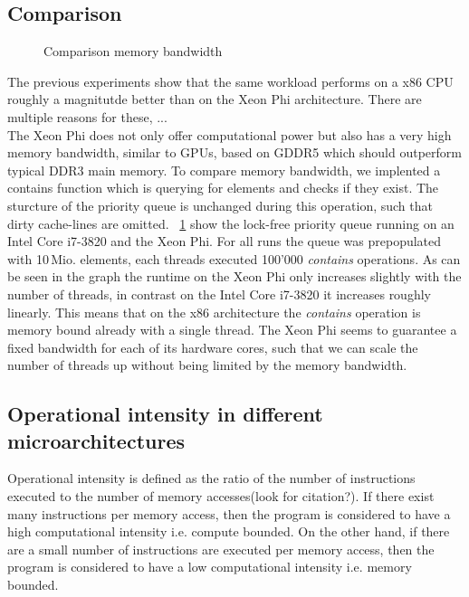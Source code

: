 \subsection{Comparison}
\begin{figure}[t]
	\centering
	
	\caption{Comparison memory bandwidth}
	\label{fig:comp_contains}
\end{figure}
The previous experiments show that the same workload performs on a x86 CPU roughly a magnitutde better than on the Xeon Phi architecture. There are multiple reasons for these, ...\\ %
The Xeon Phi does not only offer computational power but also has a very high memory bandwidth, similar to GPUs, based on GDDR5 which should outperform typical DDR3 main memory. To compare memory bandwidth, we implented a contains function which is querying for elements and checks if they exist. The sturcture of the priority queue is unchanged during this operation, such that dirty cache-lines are omitted. \figurename~\ref{fig:comp_contains} show the lock-free priority queue running on an Intel Core i7-3820 and the Xeon Phi. For all runs the queue was prepopulated with 10\,Mio. elements, each threads executed 100'000 \textit{contains} operations. As can be seen in the graph the runtime on the Xeon Phi only increases slightly with the number of threads, in contrast on the Intel Core i7-3820 it increases roughly linearly. This means that on the x86 architecture the \textit{contains} operation is memory bound already with a single thread. The Xeon Phi seems to guarantee a fixed bandwidth for each of its hardware cores, such that we can scale the number of threads up without being limited by the memory bandwidth.\\

\subsection{Operational intensity in different microarchitectures}
Operational intensity is defined as the ratio of the number of instructions executed to the number of memory accesses(look for citation?). If there exist many instructions per memory access, then the program is considered to have a high computational intensity i.e. compute bounded. On the other hand, if there are a small number of instructions are executed per memory access, then the program is considered to have a low computational intensity i.e. memory bounded.

